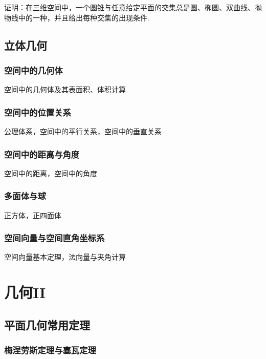\documentclass[lang=cn, zihao=5]{elegantbook}
\begin{document}
\begin{problem}
	证明：在三维空间中，一个圆锥与任意给定平面的交集总是圆、椭圆、双曲线、抛物线中的一种，并且给出每种交集的出现条件.
\end{problem}


\chapter{立体几何}

\section{空间中的几何体}

空间中的几何体及其表面积、体积计算

\section{空间中的位置关系}

公理体系，空间中的平行关系，空间中的垂直关系

\section{空间中的距离与角度}

空间中的距离，空间中的角度

\section{多面体与球}

正方体，正四面体

\section{空间向量与空间直角坐标系}

空间向量基本定理，法向量与夹角计算

\part{几何II}

\chapter{平面几何常用定理}

\section{梅涅劳斯定理与塞瓦定理}
\end{document}
